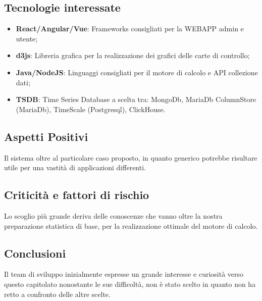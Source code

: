 \subsection{Tecnologie interessate}
	\begin{itemize}
		\item \textbf{React/Angular/Vue}: Frameworks consigliati per la WEBAPP admin e utente;
		\item \textbf{d3js}: Libreria grafica per la realizzazione dei grafici delle carte di controllo;
		\item \textbf{Java/NodeJS}: Linguaggi consigliati per il motore di calcolo e API collezione dati;
		\item \textbf{TSDB}: Time Series Database a scelta tra: MongoDb, MariaDb ColumnStore (MariaDb), TimeScale (Postgresql), ClickHouse.
	\end{itemize}

\subsection{Aspetti Positivi}
	Il sistema oltre al particolare caso proposto, in quanto generico potrebbe risultare utile per una vastità di applicazioni differenti.

\subsection{Criticità e fattori di rischio}
	Lo scoglio più grande deriva delle conoscenze che vanno oltre la nostra preparazione statistica di base, per la realizzazione ottimale del motore di calcolo.

\subsection{Conclusioni}
	Il team di sviluppo inizialmente espresse un grande interesse e curiosità verso questo capitolato nonostante le sue difficoltà, non è stato scelto in quanto non ha retto a confronto delle altre scelte. 
